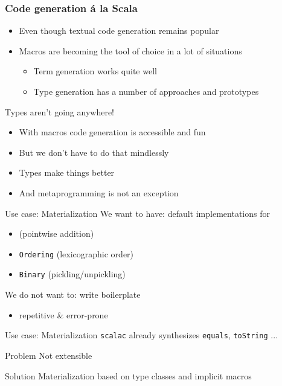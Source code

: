 \documentclass{beamer}
\begin{document}
\begin{frame}[fragile]
\frametitle{Code generation \'a la Scala}
  \begin{itemize}
  \item Even though textual code generation remains popular
  \item Macros are becoming the tool of choice in a lot of situations
    \begin{itemize}
    \item Term generation works quite well
    \item Type generation has a number of approaches and prototypes
    \end{itemize}
  \end{itemize}
\end{frame}

\begin{frame}{Types aren't going anywhere!}
  \begin{itemize}
  \item With macros code generation is accessible and fun
  \item But we don't have to do that mindlessly
  \item Types make things better
  \item And metaprogramming is not an exception
  \end{itemize}
\end{frame}

\begin{frame}{Use case: Materialization}
  We want to have: default implementations for
  \begin{itemize}
    \item \texttt{\color{red}{Semigroup}} (pointwise addition)
    \item \texttt{Ordering} (lexicographic order)
    \item \texttt{Binary} (pickling/unpickling)
  \end{itemize}

  \vspace{1em}
  We do not want to: write boilerplate
  \begin{itemize}
    \item repetitive \& error-prone
  \end{itemize}
\end{frame}

\begin{frame}{Use case: Materialization}
  \texttt{scalac} already synthesizes \texttt{equals}, \texttt{toString} ...

  \vspace{1em}
  \begin{alertblock}{Problem}
    Not extensible
  \end{alertblock}

  \vspace{1em}
  \begin{exampleblock}{Solution}
    Materialization based on type classes and implicit macros
  \end{exampleblock}
\end{frame}
\end{document}
